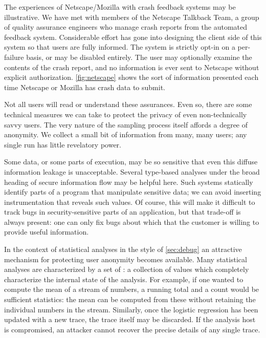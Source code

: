 The experiences of Netscape/Mozilla with crash feedback systems may be
illustrative.  We have met with members of the Netscape Talkback Team,
a group of quality assurance engineers who manage crash reports from
the automated feedback system.  Considerable effort has gone into
designing the client side of this system so that users are fully
informed.  The system is strictly opt-in on a per-failure basis, or
may be disabled entirely.  The user may optionally examine the
contents of the crash report, and no information is ever sent to
Netscape without explicit authorization.  \autoref{fig:netscape} shows
the sort of information presented each time Netscape or Mozilla has
crash data to submit.

Not all users will read or understand these assurances.
%
Even so, there are some technical measures we can take to protect the
privacy of even non-technically savvy users.  The very nature of the
sampling process itself affords a degree of anonymity.  We collect a
small bit of information from many, many users; any single run has
little revelatory power.

Some data, or some parts of execution, may be so sensitive that even
this diffuse information leakage is unacceptable.  Several type-based
analyses under the broad heading of secure information flow
\cite{1997:tapsoft:volpano,ZdZhNyMy2001} may be helpful here.  Such
systems statically identify parts of a program that manipulate
sensitive data; we can avoid inserting instrumentation that reveals
such values.  Of course, this will make it difficult to track bugs in
security-sensitive parts of an application, but that trade-off is
always present: one can only fix bugs about which that the customer is
willing to provide useful information.

In the context of statistical analyses in the style of
\autoref{sec:debug} an attractive mechanism for protecting user
anonymity becomes available.  Many statistical analyses are
characterized by a set of : a
collection of values which completely characterize the internal state
of the analysis.  For example, if one wanted to compute the mean of a
stream of numbers, a running total and a count would be sufficient
statistics: the mean can be computed from these without retaining the
individual numbers in the stream.  Similarly, once the logistic
regression has been updated with a new trace, the trace itself may be
discarded.  If the analysis host is compromised, an attacker cannot
recover the precise details of any single trace.

